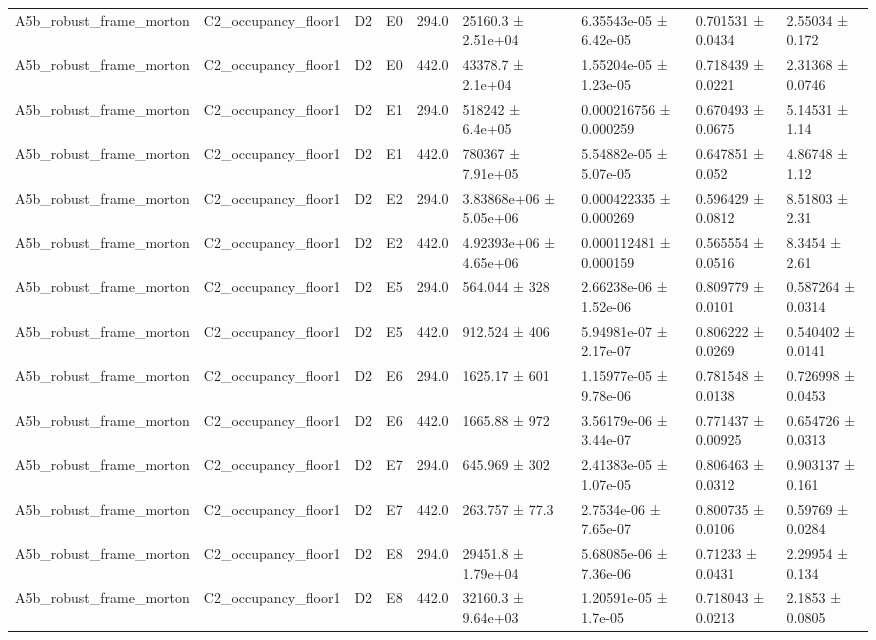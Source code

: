 \begin{table}
\begin{tabular}{lllllllll}
A5b\_robust\_frame\_morton & C2\_occupancy\_floor1 & D2 & E0 & 294.0 & 25160.3 ± 2.51e+04 & 6.35543e-05 ± 6.42e-05 & 0.701531 ± 0.0434 & 2.55034 ± 0.172 \\
A5b\_robust\_frame\_morton & C2\_occupancy\_floor1 & D2 & E0 & 442.0 & 43378.7 ± 2.1e+04 & 1.55204e-05 ± 1.23e-05 & 0.718439 ± 0.0221 & 2.31368 ± 0.0746 \\
A5b\_robust\_frame\_morton & C2\_occupancy\_floor1 & D2 & E1 & 294.0 & 518242 ± 6.4e+05 & 0.000216756 ± 0.000259 & 0.670493 ± 0.0675 & 5.14531 ± 1.14 \\
A5b\_robust\_frame\_morton & C2\_occupancy\_floor1 & D2 & E1 & 442.0 & 780367 ± 7.91e+05 & 5.54882e-05 ± 5.07e-05 & 0.647851 ± 0.052 & 4.86748 ± 1.12 \\
A5b\_robust\_frame\_morton & C2\_occupancy\_floor1 & D2 & E2 & 294.0 & 3.83868e+06 ± 5.05e+06 & 0.000422335 ± 0.000269 & 0.596429 ± 0.0812 & 8.51803 ± 2.31 \\
A5b\_robust\_frame\_morton & C2\_occupancy\_floor1 & D2 & E2 & 442.0 & 4.92393e+06 ± 4.65e+06 & 0.000112481 ± 0.000159 & 0.565554 ± 0.0516 & 8.3454 ± 2.61 \\
A5b\_robust\_frame\_morton & C2\_occupancy\_floor1 & D2 & E5 & 294.0 & 564.044 ± 328 & 2.66238e-06 ± 1.52e-06 & 0.809779 ± 0.0101 & 0.587264 ± 0.0314 \\
A5b\_robust\_frame\_morton & C2\_occupancy\_floor1 & D2 & E5 & 442.0 & 912.524 ± 406 & 5.94981e-07 ± 2.17e-07 & 0.806222 ± 0.0269 & 0.540402 ± 0.0141 \\
A5b\_robust\_frame\_morton & C2\_occupancy\_floor1 & D2 & E6 & 294.0 & 1625.17 ± 601 & 1.15977e-05 ± 9.78e-06 & 0.781548 ± 0.0138 & 0.726998 ± 0.0453 \\
A5b\_robust\_frame\_morton & C2\_occupancy\_floor1 & D2 & E6 & 442.0 & 1665.88 ± 972 & 3.56179e-06 ± 3.44e-07 & 0.771437 ± 0.00925 & 0.654726 ± 0.0313 \\
A5b\_robust\_frame\_morton & C2\_occupancy\_floor1 & D2 & E7 & 294.0 & 645.969 ± 302 & 2.41383e-05 ± 1.07e-05 & 0.806463 ± 0.0312 & 0.903137 ± 0.161 \\
A5b\_robust\_frame\_morton & C2\_occupancy\_floor1 & D2 & E7 & 442.0 & 263.757 ± 77.3 & 2.7534e-06 ± 7.65e-07 & 0.800735 ± 0.0106 & 0.59769 ± 0.0284 \\
A5b\_robust\_frame\_morton & C2\_occupancy\_floor1 & D2 & E8 & 294.0 & 29451.8 ± 1.79e+04 & 5.68085e-06 ± 7.36e-06 & 0.71233 ± 0.0431 & 2.29954 ± 0.134 \\
A5b\_robust\_frame\_morton & C2\_occupancy\_floor1 & D2 & E8 & 442.0 & 32160.3 ± 9.64e+03 & 1.20591e-05 ± 1.7e-05 & 0.718043 ± 0.0213 & 2.1853 ± 0.0805 \\

\end{tabular}
\end{table}
